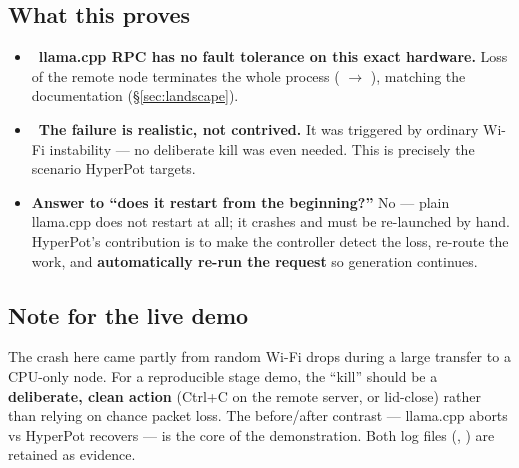 \subsection{What this proves}
\begin{itemize}[leftmargin=1.4em,nosep]
  \item \VER\ \textbf{llama.cpp RPC has no fault tolerance on this exact
  hardware.} Loss of the remote node terminates the whole process
  ( $\rightarrow$ ), matching the
  documentation (\S\ref{sec:landscape}).
  \item \VER\ \textbf{The failure is realistic, not contrived.} It was triggered
  by ordinary Wi-Fi instability --- no deliberate kill was even needed. This is
  precisely the scenario HyperPot targets.
  \item \textbf{Answer to ``does it restart from the beginning?''} No --- plain
  llama.cpp does not restart at all; it crashes and must be re-launched by hand.
  HyperPot's contribution is to make the controller detect the loss, re-route the
  work, and \textbf{automatically re-run the request} so generation continues.
\end{itemize}

\subsection{Note for the live demo}
The crash here came partly from random Wi-Fi drops during a large transfer to a
CPU-only node. For a reproducible stage demo, the ``kill'' should be a
\textbf{deliberate, clean action} (Ctrl+C on the remote server, or lid-close)
rather than relying on chance packet loss. The before/after contrast ---
llama.cpp aborts vs HyperPot recovers --- is the core of the demonstration. Both
log files (, ) are retained as evidence.
